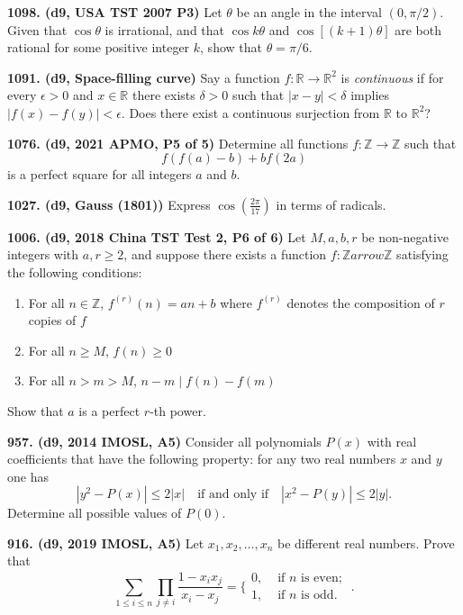 \documentclass{article}
\begin{document}
\textbf{1098. (\color{red}d9\color{black}, USA TST 2007 P3)} Let $ \theta$ be an angle in the interval $ (0,\pi/2)$. Given that $ \cos \theta$ is irrational, and that $ \cos k \theta$ and $ \cos[(k + 1)\theta ]$ are both rational for some positive integer $ k$, show that $ \theta = \pi/6$.

\textbf{1091. (\color{red}d9\color{black}, Space-filling curve)} Say a function $f : \mathbb{R} \to \mathbb{R}^2$ is \emph{continuous} if for every $\epsilon > 0$ and $x \in \mathbb{R}$ there exists $\delta > 0$ such that $|x - y| < \delta$ implies $|f(x) - f(y)| < \epsilon$. Does there exist a continuous surjection from $\mathbb{R}$ to $\mathbb{R}^2$?

\textbf{1076. (\color{red}d9\color{black}, 2021 APMO, P5 of 5)} Determine all functions $f:\mathbb{Z} \to \mathbb{Z}$ such that \[f(f(a)-b)+bf(2a)\] is a perfect square for all integers $a$ and $b$.

\textbf{1027. (\color{red}d9\color{black}, Gauss (1801))} Express $\cos(\frac{2\pi}{17})$ in terms of radicals.

\textbf{1006. (\color{red}d9\color{black}, 2018 China TST Test 2, P6 of 6)} Let $M,a,b,r$ be non-negative integers with $a,r\ge 2$, and suppose there exists a function $f:\mathbb{Z}arrow\mathbb{Z}$ satisfying the following conditions: \begin{enumerate} \item For all $n\in \mathbb{Z}$, $f^{(r)}(n)=an+b$ where $f^{(r)}$ denotes the composition of $r$ copies of $f$ \item For all $n\ge M$, $f(n)\ge 0$ \item For all $n>m>M$, $n-m \mid f(n)-f(m)$ \end{enumerate} Show that $a$ is a perfect $r$-th power.

\textbf{957. (\color{red}d9\color{black}, 2014 IMOSL, A5)} Consider all polynomials $P(x)$ with real coefficients that have the following property: for any two real numbers $x$ and $y$ one has\[|y^2-P(x)|\le 2|x|\quad\text{if and only if}\quad |x^2-P(y)|\le 2|y|.\]Determine all possible values of $P(0)$.

\textbf{916. (\color{red}d9\color{black}, 2019 IMOSL, A5)} Let $x_1, x_2, \dots, x_n$ be different real numbers. Prove that \[\sum_{1 \leq i \leq n} \prod_{j \neq i} \frac{1-x_{i}x_{j}}{x_{i}-x_{j}}=\{\begin{array}{ll} 0, & \text { if } n \text { is even; } \\ 1, & \text { if } n \text { is odd. } \end{array}.\]
\end{document}

